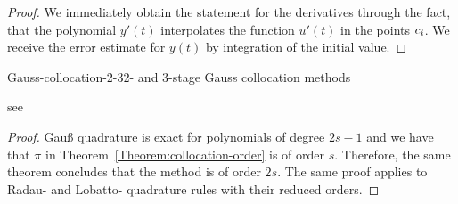 \begin{proof}
  We immediately obtain the statement for the derivatives through
  the fact, that the polynomial $y'(t)$ interpolates the function $u'(t)$ 
  in the points $c_i$. We receive the error estimate for $y(t)$
  by integration of the initial value. 
\end{proof}




\begin{Example*}{Gauss-collocation-2-3}{2- and 3-stage Gauss collocation methods}
  \mbox{}
  \begin{minipage}[t]{.4\linewidth}
    
  \end{minipage}
  \begin{minipage}[t]{.59\linewidth}
          
  \end{minipage}
	see~\cite[Tables
  7.3, 7.4]{HairerNorsettWanner93}
\end{Example*}



\begin{proof}
  Gauß quadrature is exact for polynomials of degree $2s-1$ and we
  have that $\pi$ in Theorem~\ref{Theorem:collocation-order} is of
  order $s$. Therefore, the same theorem concludes that the method is
  of order $2s$. The same proof applies to Radau- and Lobatto-
  quadrature rules with their reduced orders.
\end{proof}



